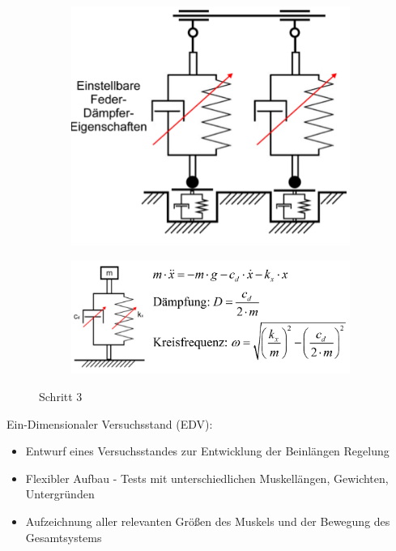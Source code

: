 \begin{figure}[h!]
	\centering
	\begin{subfigure}{.5\textwidth}
		\includegraphics[width=\textwidth]{figures/ch06_tu31.png}
		\caption{}
	\end{subfigure}
	\begin{subfigure}{.5\textwidth}
		\includegraphics[width=\textwidth]{figures/ch06_tu32.png}
		\caption{}
	\end{subfigure}
	\caption{Schritt 3}
	\label{s3}
\end{figure}
Ein-Dimensionaler Versuchsstand (EDV): 
\begin{itemize}
\item Entwurf eines Versuchsstandes zur Entwicklung der Beinlängen Regelung
\item Flexibler Aufbau - Tests mit unterschiedlichen Muskellängen, Gewichten, Untergründen
\item Aufzeichnung aller relevanten Größen des Muskels und der Bewegung des Gesamtsystems
\end{itemize}
